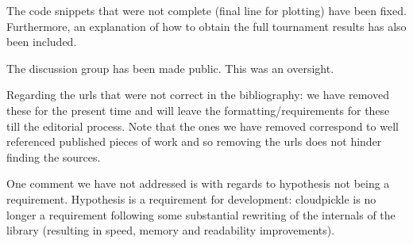 \documentclass{article}
\begin{document}
The code snippets that were not complete (final line for plotting) have been
fixed. Furthermore, an explanation of how to obtain the full tournament results
has also been included.

The discussion group has been made public. This was an oversight.

Regarding the urls that were not correct in the bibliography: we have removed
these for the present time and will leave the formatting/requirements for these
till the editorial process. Note that the ones we have removed correspond to
well referenced published pieces of work and so removing the urls does not
hinder finding the sources.

One comment we have not addressed is with regards to hypothesis not being a
requirement.
Hypothesis is a requirement for development: cloudpickle is no longer a
requirement following some substantial rewriting of the internals of the
library (resulting in speed, memory and readability improvements).
\end{document}
